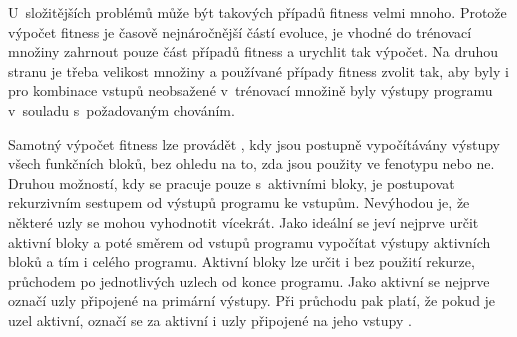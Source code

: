 U~složitějších problémů může být takových případů fitness velmi mnoho. Protože výpočet fitness je časově nejnáročnější částí evoluce, je vhodné do trénovací množiny zahrnout pouze část případů fitness a urychlit tak výpočet. Na druhou stranu je třeba velikost množiny a používané případy fitness zvolit tak, aby byly i pro kombinace vstupů neobsažené v~trénovací množině byly výstupy programu v~souladu s~požadovaným chováním.






Samotný výpočet fitness lze provádět , kdy jsou postupně vypočítávány výstupy všech funkčních bloků, bez ohledu na to, zda jsou použity ve fenotypu nebo ne. Druhou možností, kdy se pracuje pouze s~aktivními bloky, je postupovat rekurzivním sestupem od výstupů programu ke vstupům. Nevýhodou je, že některé uzly se mohou vyhodnotit vícekrát. Jako ideální se jeví nejprve určit aktivní bloky a poté směrem od vstupů programu vypočítat výstupy aktivních bloků a tím i celého programu. Aktivní bloky lze určit i bez použití rekurze, průchodem po jednotlivých uzlech od konce programu. Jako aktivní se nejprve označí uzly připojené na primární výstupy. Při průchodu pak platí, že pokud je uzel aktivní, označí se za aktivní i uzly připojené na jeho vstupy \cite{Modra, HandbookGP}.

